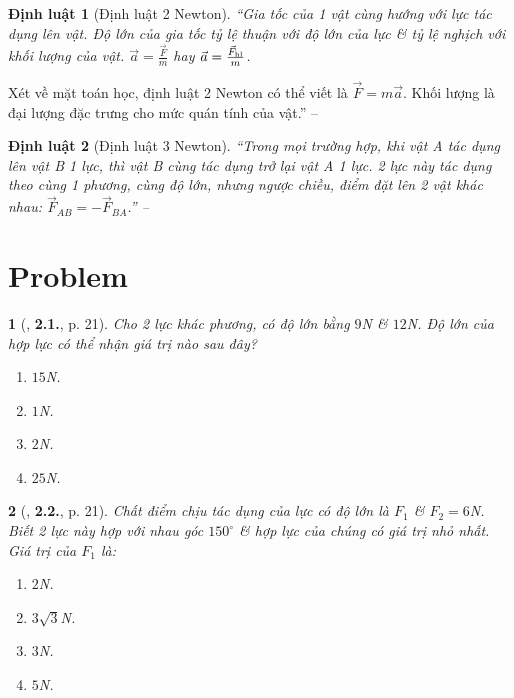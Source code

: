 \documentclass{article}
\newtheorem{baitoan}{}
\newtheorem{dinhluat}{Định luật}
\begin{document}
\begin{dinhluat}[Định luật 2 Newton]
	``Gia tốc của 1 vật cùng hướng với lực tác dụng lên vật. Độ lớn của gia tốc tỷ lệ thuận với độ lớn của lực \& tỷ lệ nghịch với khối lượng của vật. $\vec{a} = \frac{\vec{F}}{m}$ hay $\vec{a} = \frac{\vec{F}_{\rm hl}}{m}$.
\end{dinhluat}
Xét về mặt toán học, định luật 2 Newton có thể viết là $\vec{F} = m\vec{a}$. Khối lượng là đại lượng đặc trưng cho mức quán tính của vật.'' -- \cite[p. 19]{Giang_Hang_Trung2022}

\begin{dinhluat}[Định luật 3 Newton]
	``Trong mọi trường hợp, khi vật A tác dụng lên vật B 1 lực, thì vật B cùng tác dụng trở lại vật A 1 lực. 2 lực này tác dụng theo cùng 1 phương, cùng độ lớn, nhưng ngược chiều, điểm đặt lên 2 vật khác nhau: $\vec{F}_{AB} = -\vec{F}_{BA}$.'' -- \cite[p. 20]{Giang_Hang_Trung2022}
\end{dinhluat}

\section{Problem}

\begin{baitoan}[\cite{Giang_Hang_Trung2022}, \textbf{2.1.}, p. 21]
	Cho 2 lực khác phương, có độ lớn bằng $9$\emph{N} \& $12$\emph{N}. Độ lớn của hợp lực có thể nhận giá trị nào sau đây?
	\begin{enumerate}
		\item[{\rm\sf A.}] $15$\emph{N}.
		\item[{\rm\sf B.}] $1$\emph{N}.
		\item[{\rm\sf C.}] $2$\emph{N}.
		\item[{\rm\sf D.}] $25$\emph{N}.
	\end{enumerate}
\end{baitoan}

\begin{baitoan}[\cite{Giang_Hang_Trung2022}, \textbf{2.2.}, p. 21]
	Chất điểm chịu tác dụng của lực có độ lớn là $F_1$ \& $F_2 = 6$\emph{N}. Biết 2 lực này hợp với nhau góc $150^\circ$ \& hợp lực của chúng có giá trị nhỏ nhất. Giá trị của $F_1$ là: 
	\begin{enumerate}
		\item[{\rm\sf A.}] $2$\emph{N}.
		\item[{\rm\sf B.}] $3\sqrt{3}$\emph{N}.
		\item[{\rm\sf C.}] $3$\emph{N}.
		\item[{\rm\sf D.}] $5$\emph{N}.
	\end{enumerate}
\end{baitoan}


\printbibliography[heading=bibintoc]
	
\end{document}
